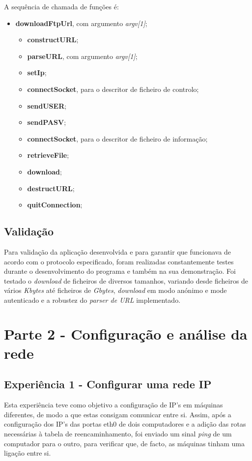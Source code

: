 \documentclass[a4paper, 11pt]{article}
\begin{document}
A sequência de chamada de funções é:
\begin{itemize}
	\item \textbf{downloadFtpUrl}, com argumento \textit{argv[1]};
	\begin{itemize}
		\item \textbf{constructURL};
		\item \textbf{parseURL}, com argumento \textit{argv[1]};
		\item \textbf{setIp};
		\item \textbf{connectSocket}, para o descritor de ficheiro de controlo;
		\item \textbf{sendUSER};
		\item \textbf{sendPASV};
		\item \textbf{connectSocket}, para o descritor de ficheiro de informação;
		\item \textbf{retrieveFile};
		\item \textbf{download};
		\item \textbf{destructURL};
		\item \textbf{quitConnection};
	\end{itemize}
\end{itemize}

\subsection{Validação}

Para validação da aplicação desenvolvida e para garantir que funcionava de acordo com o protocolo especificado, foram realizadas constantemente testes durante o desenvolvimento do programa e também na sua demonstração. Foi testado o \textit{download} de ficheiros de diversos tamanhos, variando desde ficheiros de vários \textit {Kbytes} até ficheiros de \textit{Gbytes}, \textit{download} em modo anónimo e mode autenticado e a robustez do \textit{parser de URL} implementado.

\section{Parte 2 - Configuração e análise da rede}

\subsection{Experiência 1 - Configurar uma rede IP}
Esta experiência teve como objetivo a configuração de IP’s em máquinas diferentes, de modo a que estas consigam comunicar entre si. Assim, após a configuração dos IP’s das portas eth0 de dois computadores e a adição das rotas necessárias à tabela de reencaminhamento, foi enviado um sinal \textit{ping} de um computador para o outro, para verificar que, de facto, as máquinas tinham uma ligação entre si.
\end{document}
